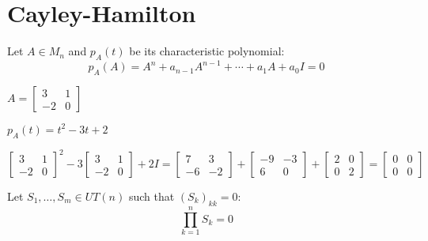 \documentclass[letterpaper,12pt,fleqn]{article}
\begin{document}
\section*{Cayley-Hamilton}

\begin{theorem}
  Let $A\in M_n$ and $p_A(t)$ be its characteristic polynomial:
  \[p_A(A)=A^n+a_{n-1}A^{n-1}+\cdots+a_1A+a_0I=0\]
\end{theorem}

\begin{example}
  \newcommand{\A}{\begin{bmatrix} 3 & 1 \\ -2 & 0 \end{bmatrix}}
  $A=\A$

  $p_A(t)=t^2-3t+2$

  $\A^2-3\A+2I=\begin{bmatrix} 7 & 3 \\ -6 & -2 \end{bmatrix} +
  \begin{bmatrix} -9 & -3 \\ 6 & 0 \end{bmatrix} +
  \begin{bmatrix} 2 & 0 \\ 0 & 2 \end{bmatrix}=
  \begin{bmatrix} 0 & 0 \\ 0 & 0 \end{bmatrix}$
\end{example}

\begin{lemma}
  Let $S_1,\ldots,S_m\in UT(n)$ such that $(S_k)_{kk}=0$:
  \[\prod_{k=1}^nS_k=0\]
\end{lemma}
\end{document}
